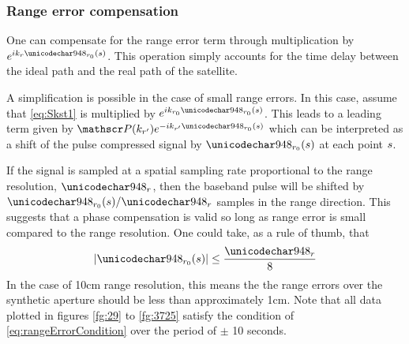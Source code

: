 \subsubsection*{Range error compensation}
\label{sc:phaseCompensation}
One can compensate for the range error term through multiplication by $\eex{\im\kr\rangeErrorZero(\parm)}$. This operation simply accounts for the time delay between the ideal path and the real path of the satellite.
\par
A simplification is possible in the case of small range errors. In this case, assume that \eqref{eq:Skst1} is multiplied by $\eex{\im\krnaught\rangeErrorZero(\parm)}$. This leads to a leading term given by $\Snvelope(\krc)\eex{-\im\krc\rangeErrorZero(\parm)}$ which can be interpreted as a shift of the pulse compressed signal by $\rangeErrorZero(\parm)$ at each point $s$. 
\par
If the signal is sampled at a spatial sampling rate proportional to the range resolution, $\rresolution$, then the baseband pulse will be shifted by $\rangeErrorZero(\parm)/\rresolution$ samples in the range direction. This suggests that a phase compensation is valid so long as range error is small compared to the range resolution. One could take, as a rule of thumb, that 
\begin{equation}
\lvert\rangeErrorZero(\parm)\rvert\leq\frac{\rresolution}{8} 
\label{eq:rangeErrorCondition}
\end{equation}
In the case of 10cm range resolution, this means the the range errors over the synthetic aperture should be less than approximately 1cm. Note that all data plotted in figures \ref{fg:29} to \ref{fg:3725} satisfy the condition of \eqref{eq:rangeErrorCondition} over the period of $\pm$ 10 seconds.

